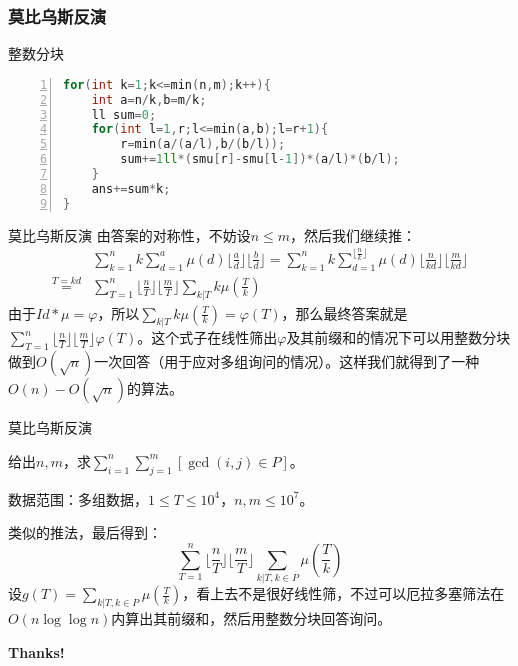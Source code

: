 \documentclass{ctexbeamer}        %
\begin{document}
\begin{frame}[fragile]
\frametitle{莫比乌斯反演}
\begin{block}{整数分块}
\begin{lstlisting}[language={c++},
                   numbers=left]
for(int k=1;k<=min(n,m);k++){
    int a=n/k,b=m/k;
    ll sum=0;
    for(int l=1,r;l<=min(a,b);l=r+1){
        r=min(a/(a/l),b/(b/l));
        sum+=1ll*(smu[r]-smu[l-1])*(a/l)*(b/l);
    }
    ans+=sum*k;
}
\end{lstlisting}
\end{block}
\end{frame}

\begin{frame}{莫比乌斯反演}
由答案的对称性，不妨设$n \le m$，然后我们继续推：
\begin{align*}
    &\sum_{k=1}^{n}k\sum_{d=1}^{a}\mu(d)\lfloor \frac{a}{d} \rfloor \lfloor \frac{b}{d} \rfloor=\sum_{k=1}^{n}k\sum_{d=1}^{\lfloor \frac{n}{k} \rfloor}\mu(d)\lfloor \frac{n}{kd} \rfloor \lfloor \frac{m}{kd} \rfloor \\
    \overset{T=kd}{=}& \sum_{T=1}^{n} \lfloor \frac{n}{T} \rfloor \lfloor \frac{m}{T} \rfloor \sum_{k|T} k\mu(\frac{T}{k})
\end{align*}
由于$Id \ast \mu = \varphi$，所以$\sum_{k|T} k\mu(\frac{T}{k})=\varphi(T)$，那么最终答案就是$\sum_{T=1}^{n} \lfloor \frac{n}{T} \rfloor \lfloor \frac{m}{T} \rfloor \varphi(T)$。这个式子在线性筛出$\varphi$及其前缀和的情况下可以用整数分块做到$O(\sqrt{n})$一次回答（用于应对多组询问的情况）。这样我们就得到了一种$O(n)-O(\sqrt{n})$的算法。
\end{frame}

\begin{frame}{莫比乌斯反演}
\begin{example}[accoders6724]
    给出$n,m$，求$\sum_{i=1}^n\sum_{j=1}^m [\gcd(i,j) \in P]$。

    数据范围：多组数据，$1 \le T \le 10^4$，$n,m \le 10^7$。
\end{example}
\pause
类似的推法，最后得到：
$$\sum_{T=1}^{n} \lfloor \frac{n}{T} \rfloor \lfloor \frac{m}{T} \rfloor \sum_{k|T,k\in P} \mu(\frac{T}{k})$$
设$g(T)=\sum_{k|T,k\in P} \mu(\frac{T}{k})$，看上去不是很好线性筛，不过可以厄拉多塞筛法在$O(n\log\log n)$内算出其前缀和，然后用整数分块回答询问。
\end{frame}

\begin{frame}[plain]    %
	\vspace{0.4\textheight}
	\begin{center}
		\Huge\color{blue}\bfseries Thanks!
	\end{center}
\end{frame}
\end{document}
